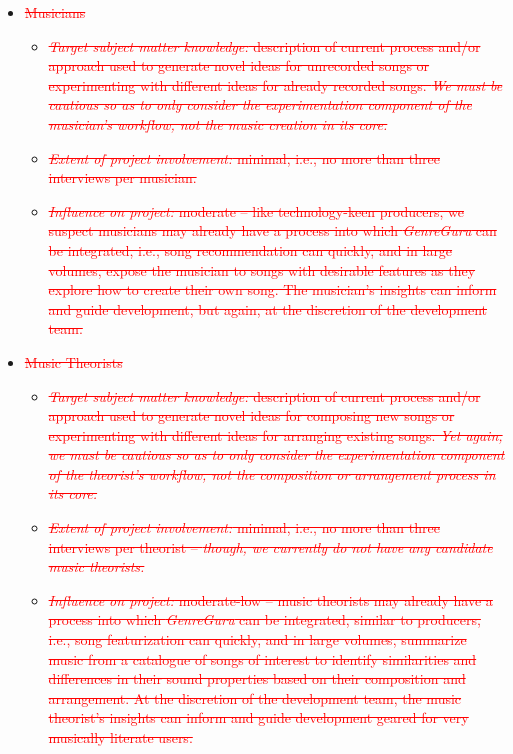 \documentclass[12pt]{article}
\begin{document}
\begin{itemize}
\begin{itemize}
    \item \textcolor{red}{\sout{Musicians}} 
    \begin{itemize}
      \item \textcolor{red}{\sout{\emph{Target subject matter knowledge:} description of current process and/or approach used to generate novel ideas for unrecorded songs or experimenting with different ideas for already recorded songs. \emph{We must be cautious so as to only consider the experimentation component of the musician's workflow, not the music creation in its core.}}}
      \item \textcolor{red}{\sout{\emph{Extent of project involvement:} minimal, i.e., no more than three interviews per musician.}} 
      \item \textcolor{red}{\sout{\emph{Influence on project:} moderate -- like technology-keen producers, we suspect musicians may already have a process into which \emph{GenreGuru} can be integrated, i.e., song recommendation can quickly, and in large volumes, expose the musician to songs with desirable features as they explore how to create their own song. The musician's insights can inform and guide development, but again, at the discretion of the development team.}}
    \end{itemize}
    
    \item \textcolor{red}{\sout{Music Theorists}}
    \begin{itemize}
      \item \textcolor{red}{\sout{\emph{Target subject matter knowledge:} description of current process and/or approach used to generate novel ideas for composing new songs or experimenting with different ideas for arranging existing songs. \emph{Yet again, we must be cautious so as to only consider the experimentation component of the theorist's workflow, not the composition or arrangement process in its core.}}}
      \item \textcolor{red}{\sout{\emph{Extent of project involvement:} minimal, i.e., no more than three interviews per theorist -- \emph{though, we currently do not have any candidate music theorists.}}}
      \item \textcolor{red}{\sout{\emph{Influence on project:} moderate-low -- music theorists may already have a process into which \emph{GenreGuru} can be integrated, similar to producers, i.e., song featurization can quickly, and in large volumes, summarize music from a catalogue of songs of interest to identify similarities and differences in their sound properties based on their composition and arrangement. At the discretion of the development team, the music theorist's insights can inform and guide development geared for very musically literate users.}}
    \end{itemize}
    

\end{itemize}
\end{itemize}
\end{document}

